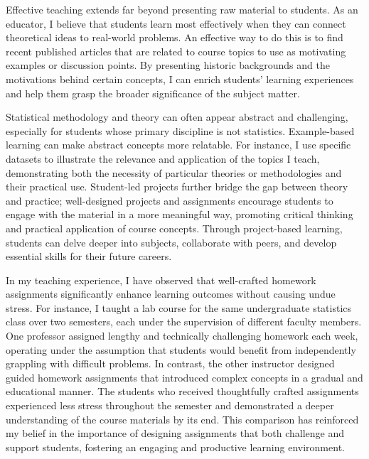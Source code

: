\documentclass{article}
\begin{document}
Effective teaching extends far beyond presenting raw material to students.
As an educator, I believe that students learn most effectively when they can connect theoretical ideas to real-world problems.
An effective way to do this is to find recent published articles that are related to course topics to use as motivating examples or discussion points.
By presenting historic backgrounds and the motivations behind certain concepts, I can enrich students' learning experiences and help them grasp the broader significance of the subject matter.

Statistical methodology and theory can often appear abstract and challenging, especially for students whose primary discipline is not statistics.
Example-based learning can make abstract concepts more relatable.
For instance, I use specific datasets to illustrate the relevance and application of the topics I teach, demonstrating both the necessity of particular theories or methodologies and their practical use.
Student-led projects further bridge the gap between theory and practice; well-designed projects and assignments encourage students to engage with the material in a more meaningful way, promoting critical thinking and practical application of course concepts.
Through project-based learning, students can delve deeper into subjects, collaborate with peers, and develop essential skills for their future careers.

In my teaching experience, I have observed that well-crafted homework assignments significantly enhance learning outcomes without causing undue stress.
For instance, I taught a lab course for the same undergraduate statistics class over two semesters, each under the supervision of different faculty members.
One professor assigned lengthy and technically challenging homework each week, operating under the assumption that students would benefit from independently grappling with difficult problems.
In contrast, the other instructor designed guided homework assignments that introduced complex concepts in a gradual and educational manner.
The students who received thoughtfully crafted assignments experienced less stress throughout the semester and demonstrated a deeper understanding of the course materials by its end.
This comparison has reinforced my belief in the importance of designing assignments that both challenge and support students, fostering an engaging and productive learning environment.
\end{document}
